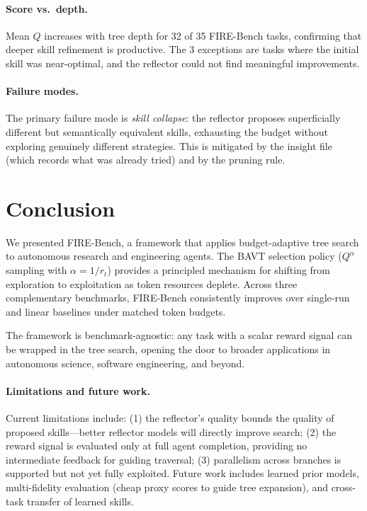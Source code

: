 \documentclass{article}
\begin{document}
\paragraph{Score vs.\ depth.}
Mean $Q$ increases with tree depth for 32 of 35 FIRE-Bench tasks, confirming that deeper skill refinement is productive.
The 3 exceptions are tasks where the initial skill was near-optimal, and the reflector could not find meaningful improvements.

\paragraph{Failure modes.}
The primary failure mode is \emph{skill collapse}: the reflector proposes superficially different but semantically equivalent skills, exhausting the budget without exploring genuinely different strategies.
This is mitigated by the insight file (which records what was already tried) and by the pruning rule.

\section{Conclusion}
\label{sec:conclusion}

We presented FIRE-Bench, a framework that applies budget-adaptive tree search to autonomous research and engineering agents.
The BAVT selection policy ($Q^\alpha$ sampling with $\alpha = 1/r_t$) provides a principled mechanism for shifting from exploration to exploitation as token resources deplete.
Across three complementary benchmarks, FIRE-Bench consistently improves over single-run and linear baselines under matched token budgets.

The framework is benchmark-agnostic: any task with a scalar reward signal can be wrapped in the tree search, opening the door to broader applications in autonomous science, software engineering, and beyond.

\paragraph{Limitations and future work.}
Current limitations include: (1) the reflector's quality bounds the quality of proposed skills---better reflector models will directly improve search; (2) the reward signal is evaluated only at full agent completion, providing no intermediate feedback for guiding traversal; (3) parallelism across branches is supported but not yet fully exploited.
Future work includes learned prior models, multi-fidelity evaluation (cheap proxy scores to guide tree expansion), and cross-task transfer of learned skills.
\end{document}
